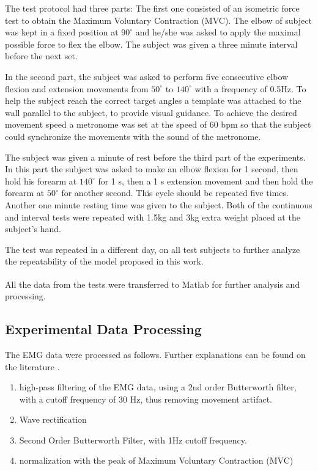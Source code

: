 \documentclass[letterpaper, 10 pt, conference]{ieeeconf}  %
\begin{document}
The test protocol had three parts: The first one consisted of an isometric force test to obtain the Maximum Voluntary Contraction (MVC). The elbow of subject was kept in a fixed position at \(90^{\circ}\) and he/she was asked to apply the maximal possible force to flex the elbow. The subject was given a three minute interval before the next set.

In the second part, the subject was asked to perform five consecutive elbow flexion and extension movements from  \(50^{\circ}\) to \(140^{\circ}\) with a frequency of 0.5Hz. To help the subject reach the correct target angles a template was attached to the wall parallel to the subject, to provide visual guidance. To achieve the desired movement speed a metronome was set at the speed of 60 bpm so that the subject could synchronize the movements with the sound of the metronome.    

   The subject was given a minute of rest before the third part of the experiments. In this part the subject was asked to make an elbow flexion for 1 second, then hold his forearm at \(140^{\circ}\) for 1 s, then a 1 s extension movement and then hold the forearm at \(50^{\circ}\) for another second. This cycle should be repeated five times. Another one minute resting time was given to the subject.
Both of the continuous and interval tests were repeated with 1.5kg and 3kg extra weight placed at the subject's hand.

The test was repeated in a different day, on all test subjects to further analyze the repeatability of the model proposed in this work.

All the data from the tests were transferred to Matlab\textsuperscript{\textregistered} for further analysis and processing.


\subsection{Experimental Data Processing}

The EMG data were processed as follows. Further explanations can be found on the literature \cite{Rose20161112,Hayashibe20091621}.
\begin{enumerate}
\item high-pass filtering of the EMG data, using a 2nd order Butterworth filter, with a cutoff frequency of 30 Hz, thus removing movement artifact.
\item Wave rectification
\item Second Order Butterworth Filter, with 1Hz cutoff frequency.
\item normalization with the peak of Maximum Voluntary Contraction (MVC)
\end{enumerate}
\end{document}
